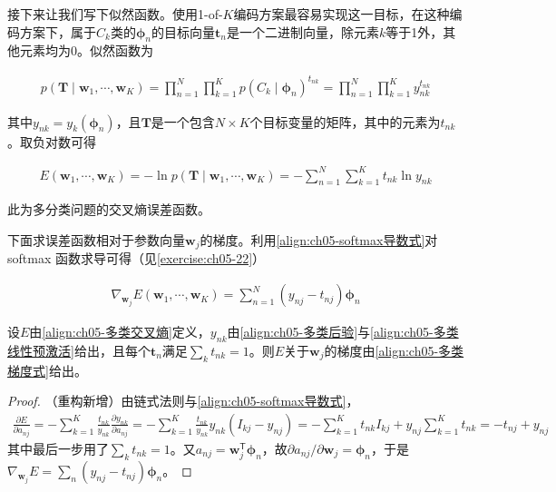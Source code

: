 \documentclass[../../main.tex]{subfiles}
\begin{document}
接下来让我们写下似然函数。使用1-of-$K$编码方案最容易实现这一目标，在这种编码方案下，属于$C_k$类的$\boldsymbol{\phi}_n$的目标向量$\boldsymbol{t}_n$是一个二进制向量，除元素$k$等于1外，其他元素均为0。似然函数为

\begin{align}
  p(\boldsymbol{T}\mid\boldsymbol{w}_1,\cdots,\boldsymbol{w}_K)=\prod_{n=1}^{N}\prod_{k=1}^{K}p(C_k\mid\boldsymbol{\phi}_n)^{t_{nk}}=\prod_{n=1}^{N}\prod_{k=1}^{K}y_{nk}^{t_{nk}}
  \label{align:ch05-多类似然}
\end{align}

其中$y_{nk}=y_k(\boldsymbol{\phi}_n)$，且$\boldsymbol{T}$是一个包含$N\times K$个目标变量的矩阵，其中的元素为$t_{nk}$。取负对数可得

\begin{align}
  E(\boldsymbol{w}_1,\cdots,\boldsymbol{w}_K)=-\ln p(\boldsymbol{T}\mid\boldsymbol{w}_1,\cdots,\boldsymbol{w}_K)=-\sum_{n=1}^{N}\sum_{k=1}^{K}t_{nk}\ln y_{nk}
  \label{align:ch05-多类交叉熵}
\end{align}

此为多分类问题的交叉熵误差函数。

下面求误差函数相对于参数向量$\boldsymbol{w}_j$的梯度。利用\eqref{align:ch05-softmax导数式}对 softmax 函数求导可得（见\cref{exercise:ch05-22}）

\begin{align}
  \nabla_{\boldsymbol{w}_j}E(\boldsymbol{w}_1,\cdots,\boldsymbol{w}_K)=\sum_{n=1}^{N}\left(y_{nj}-t_{nj}\right)\boldsymbol{\phi}_n
  \label{align:ch05-多类梯度式}
\end{align}

\begin{proposition}[多类交叉熵误差的梯度]\label{proposition:ch05-多类梯度}
设$E$由\eqref{align:ch05-多类交叉熵}定义，$y_{nk}$由\eqref{align:ch05-多类后验}与\eqref{align:ch05-多类线性预激活}给出，且每个$\boldsymbol{t}_n$满足$\sum_k t_{nk}=1$。则$E$关于$\boldsymbol{w}_j$的梯度由\eqref{align:ch05-多类梯度式}给出。
\end{proposition}

\begin{proof}
（重构新增）由链式法则与\eqref{align:ch05-softmax导数式}，
\begin{align}
  \frac{\partial E}{\partial a_{nj}}=-\sum_{k=1}^{K}\frac{t_{nk}}{y_{nk}}\frac{\partial y_{nk}}{\partial a_{nj}}=-\sum_{k=1}^{K}\frac{t_{nk}}{y_{nk}}y_{nk}\left(I_{kj}-y_{nj}\right)=-\sum_{k=1}^{K}t_{nk}I_{kj}+y_{nj}\sum_{k=1}^{K}t_{nk}=-t_{nj}+y_{nj}
\end{align}
其中最后一步用了$\sum_k t_{nk}=1$。又$a_{nj}=\boldsymbol{w}_j^{\mathsf{T}}\boldsymbol{\phi}_n$，故$\partial a_{nj}/\partial\boldsymbol{w}_j=\boldsymbol{\phi}_n$，于是$\nabla_{\boldsymbol{w}_j}E=\sum_n(y_{nj}-t_{nj})\boldsymbol{\phi}_n$。
\end{proof}
\end{document}
